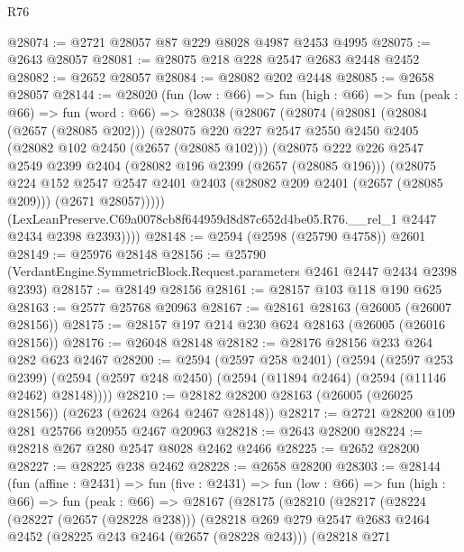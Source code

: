 \begin{lexlean}{R76}
\begin{coremodule}
@28074 := @2721 @28057 @87 @229 @8028 @4987 @2453 @4995
@28075 := @2643 @28057
@28081 := @28075 @218 @228 @2547 @2683 @2448 @2452
@28082 := @2652 @28057
@28084 := @28082 @202 @2448
@28085 := @2658 @28057
@28144 := @28020
    (fun (low : @66) =>
    fun (high : @66) =>
    fun (peak : @66) =>
    fun (word : @66) =>
    @28038
      (@28067
        (@28074
          (@28081
            (@28084 (@2657 (@28085 @202)))
            (@28075
              @220
              @227
              @2547
              @2550
              @2450
              @2405
              (@28082 @102 @2450 (@2657 (@28085 @102)))
              (@28075
                @222
                @226
                @2547
                @2549
                @2399
                @2404
                (@28082 @196 @2399 (@2657 (@28085 @196)))
                (@28075
                  @224
                  @152
                  @2547
                  @2547
                  @2401
                  @2403
                  (@28082 @209 @2401 (@2657 (@28085 @209)))
                  (@2671 @28057)))))
          (LexLeanPreserve.C69a0078cb8f644959d8d87c652d4be05.R76.__rel_1 @2447 @2434 @2398 @2393))))
@28148 := @2594 (@2598 (@25790 @4758)) @2601
@28149 := @25976 @28148
@28156 := @25790 (VerdantEngine.SymmetricBlock.Request.parameters @2461 @2447 @2434 @2398 @2393)
@28157 := @28149 @28156
@28161 := @28157 @103 @118 @190 @625
@28163 := @2577 @25768 @20963
@28167 := @28161 @28163 (@26005 (@26007 @28156))
@28175 := @28157 @197 @214 @230 @624 @28163 (@26005 (@26016 @28156))
@28176 := @26048 @28148
@28182 := @28176 @28156 @233 @264 @282 @623 @2467
@28200 := @2594
    (@2597 @258 @2401)
    (@2594
      (@2597 @253 @2399)
      (@2594 (@2597 @248 @2450) (@2594 (@11894 @2464) (@2594 (@11146 @2462) @28148))))
@28210 := @28182 @28200 @28163 (@26005 (@26025 @28156)) (@2623 (@2624 @264 @2467 @28148))
@28217 := @2721 @28200 @109 @281 @25766 @20955 @2467 @20963
@28218 := @2643 @28200
@28224 := @28218 @267 @280 @2547 @8028 @2462 @2466
@28225 := @2652 @28200
@28227 := @28225 @238 @2462
@28228 := @2658 @28200
@28303 := @28144
    (fun (affine : @2431) =>
    fun (five : @2431) =>
    fun (low : @66) =>
    fun (high : @66) =>
    fun (peak : @66) =>
    @28167
      (@28175
        (@28210
          (@28217
            (@28224
              (@28227 (@2657 (@28228 @238)))
              (@28218
                @269
                @279
                @2547
                @2683
                @2464
                @2452
                (@28225 @243 @2464 (@2657 (@28228 @243)))
                (@28218
                  @271

\end{coremodule}
\end{lexlean}
